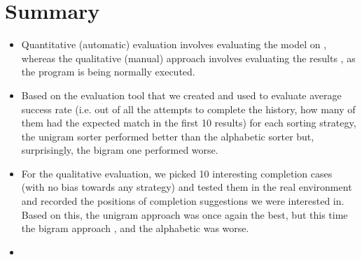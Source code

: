 \section{Summary}
\label{sec:Evaluation-Summary}
\begin{itemize}
    \item Quantitative (automatic) evaluation involves evaluating the model on , whereas the qualitative (manual) approach involves evaluating the results , as the program is being normally executed.
    \item Based on the evaluation tool that we created and used to evaluate average success rate (i.e. out of all the attempts to complete the history, how many of them had the expected match in the first 10 results) for each sorting strategy, the unigram sorter performed better than the alphabetic sorter but, surprisingly, the bigram one performed worse.
    \item For the qualitative evaluation, we picked 10 interesting completion cases (with no bias towards any strategy) and tested them in the real environment and recorded the positions of completion suggestions we were interested in. Based on this, the unigram approach was once again the best, but this time the bigram approach , and the alphabetic was worse.
    \item {} 
\end{itemize}